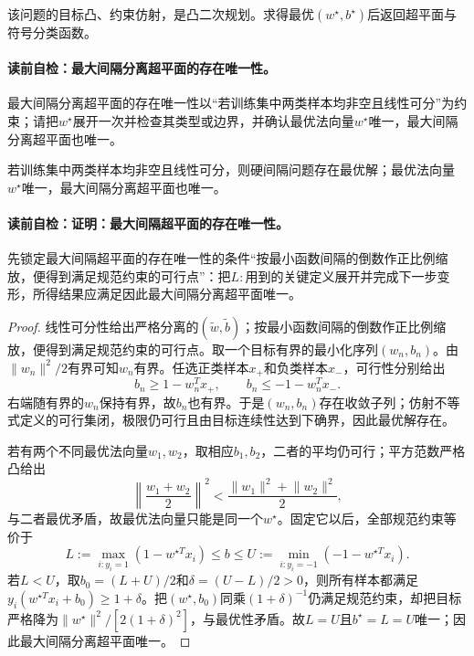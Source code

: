 该问题的目标凸、约束仿射，是凸二次规划。求得最优$(w^\star,b^\star)$后返回超平面与符号分类函数。

\paragraph{读前自检：最大间隔分离超平面的存在唯一性。}最大间隔分离超平面的存在唯一性以“若训练集中两类样本均非空且线性可分”为约束；请把$w^\star$展开一次并检查其类型或边界，并确认最优法向量$w^\star$唯一，最大间隔分离超平面也唯一。\par

\label{struct:V3-C02-CH12}
\begin{theorem}[最大间隔超平面的存在唯一性]\label{thm:V3-C02-hard-unique}
若训练集中两类样本均非空且线性可分，则硬间隔问题存在最优解；最优法向量$w^\star$唯一，最大间隔分离超平面也唯一。
\end{theorem}

\label{struct:V3-C02-CH13}
\paragraph{读前自检：证明：最大间隔超平面的存在唯一性。}先锁定最大间隔超平面的存在唯一性的条件“按最小函数间隔的倒数作正比例缩放，便得到满足规范约束的可行点”：把$L:$用到的关键定义展开并完成下一步变形，所得结果应满足因此最大间隔分离超平面唯一。\par

\begin{proof}
线性可分性给出严格分离的$(\widetilde w,\widetilde b)$；按最小函数间隔的倒数作正比例缩放，便得到满足规范约束的可行点。取一个目标有界的最小化序列$(w_n,b_n)$。由$\|w_n\|^2/2$有界可知$w_n$有界。任选正类样本$x_+$和负类样本$x_-$，可行性分别给出
\[
b_n\geq 1-w_n^Tx_+,
\qquad
b_n\leq -1-w_n^Tx_-.
\]
右端随有界的$w_n$保持有界，故$b_n$也有界。于是$(w_n,b_n)$存在收敛子列；仿射不等式定义的可行集闭，极限仍可行且由目标连续性达到下确界，因此最优解存在。

若有两个不同最优法向量$w_1,w_2$，取相应$b_1,b_2$，二者的平均仍可行；平方范数严格凸给出
\[
\left\|\frac{w_1+w_2}{2}\right\|^2
<\frac{\lVert w_1\rVert^2+\lVert w_2\rVert^2}{2},
\]
与二者最优矛盾，故最优法向量只能是同一个$w^\star$。固定它以后，全部规范约束等价于
\[
L:=\max_{i:y_i=1}(1-w^{\star T}x_i)\leq b
\leq U:=\min_{i:y_i=-1}(-1-w^{\star T}x_i).
\]
若$L<U$，取$b_0=(L+U)/2$和$\delta=(U-L)/2>0$，则所有样本都满足
$y_i(w^{\star T}x_i+b_0)\geq1+\delta$。把$(w^\star,b_0)$同乘$(1+\delta)^{-1}$仍满足规范约束，却把目标严格降为$\|w^\star\|^2/[2(1+\delta)^2]$，与最优性矛盾。故$L=U$且$b^\star=L=U$唯一；因此最大间隔分离超平面唯一。
\end{proof}

